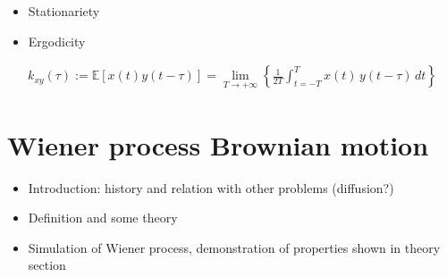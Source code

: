 \documentclass[letterpaper,10pt,english]{jupyterBook}
\begin{document}
\sphinxAtStartPar
{}
\begin{itemize}
\item {} 
\sphinxAtStartPar
Stationariety

\item {} 
\sphinxAtStartPar
Ergodicity

\end{itemize}
\begin{equation*}
\begin{split}k_{xy}(\tau) := \mathbb{E}[x(t) y(t-\tau)] = \lim_{T\rightarrow +\infty} \left\{ \frac{1}{2T} \int_{t = -T}^{T} x(t) \, y(t-\tau) \, d t \right\}\end{split}
\end{equation*}
\sphinxstepscope


\section{Wiener process \sphinxhyphen{} Brownian motion}
\label{\detokenize{ch/prob/wiener:wiener-process-brownian-motion}}\label{\detokenize{ch/prob/wiener:prob-processes-wiener}}\label{\detokenize{ch/prob/wiener::doc}}\begin{itemize}
\item {} 
\sphinxAtStartPar
Introduction: history and relation with other problems (diffusion?)

\item {} 
\sphinxAtStartPar
Definition and some theory

\item {} 
\sphinxAtStartPar
Simulation of Wiener process, demonstration of properties shown in theory section

\end{itemize}
\end{document}
